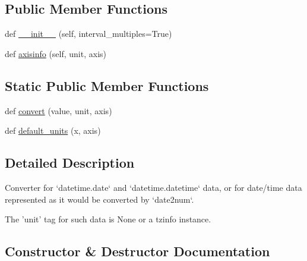 \subsection*{Public Member Functions}
\begin{DoxyCompactItemize}
\item 
def \hyperlink{classmatplotlib_1_1dates_1_1DateConverter_a8364eaa3c0f5eb9d5578281ed632a615}{\+\_\+\+\_\+init\+\_\+\+\_\+} (self, interval\+\_\+multiples=True)
\item 
def \hyperlink{classmatplotlib_1_1dates_1_1DateConverter_a2ea7a5964e09496d5e713710a8a5006d}{axisinfo} (self, unit, axis)
\end{DoxyCompactItemize}
\subsection*{Static Public Member Functions}
\begin{DoxyCompactItemize}
\item 
def \hyperlink{classmatplotlib_1_1dates_1_1DateConverter_a752b3ec2415640301ad18ba0e18c2f3f}{convert} (value, unit, axis)
\item 
def \hyperlink{classmatplotlib_1_1dates_1_1DateConverter_a5aee58e254b88faee5deddcc1ff756e9}{default\+\_\+units} (x, axis)
\end{DoxyCompactItemize}


\subsection{Detailed Description}
\begin{DoxyVerb}Converter for `datetime.date` and `datetime.datetime` data, or for
date/time data represented as it would be converted by `date2num`.

The 'unit' tag for such data is None or a tzinfo instance.
\end{DoxyVerb}
 

\subsection{Constructor \& Destructor Documentation}
\mbox{\label{classmatplotlib_1_1dates_1_1DateConverter_a8364eaa3c0f5eb9d5578281ed632a615}} 
